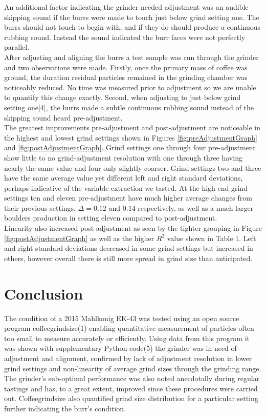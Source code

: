 \documentclass[10pt,a4paper,twocolumn,notitlepage]{article}
\begin{document}
An additional factor indicating the grinder needed adjustment was an audible skipping sound if the burrs were made to touch just below grind setting one. The burrs should not touch to begin with, and if they do should produce a continuous rubbing sound. Instead the sound indicated the burr faces were not perfectly parallel. \\

After adjusting and aligning the burrs a test sample was run through the grinder and two observations were made. Firstly, once the primary mass of coffee was ground, the duration residual particles remained in the grinding chamber was noticeably reduced. No time was measured prior to adjustment so we are unable to quantify this change exactly. Second, when adjusting to just below grind setting one[4], the burrs made a subtle continuous rubbing sound instead of the skipping sound heard pre-adjustment. \\

The greatest improvements pre-adjustment and post-adjustment are noticeable in the highest and lowest grind settings shown in Figures \ref{fig:preAdjustmentGraph} and \ref{fig:postAdjustmentGraph}. Grind settings one through four pre-adjustment show little to no grind-adjustment resolution with one through three having nearly the same value and four only slightly coarser. Grind settings two and three have the same average value yet different left and right standard deviations, perhaps indicative of the variable extraction we tasted. At the high end grind settings ten and eleven pre-adjustment have much higher average changes from their previous settings, $\Delta=0.12$ and $0.14$ respectively, as well as a much larger boulders production in setting eleven compared to post-adjustment.\\

Linearity also increased post-adjustment as seen by the tighter grouping in Figure \ref{fig:postAdjustmentGraph} as well as the higher $R^2$ value shown in Table 1. Left and right standard deviations decreased in some grind settings but increased in others, however overall there is still more spread in grind size than anticipated. \\

\section{Conclusion}

The condition of a 2015 Mahlkonig EK-43 was tested using an open source program coffeegrindsize(1) enabling quantitative measurement of particles often too small to measure accurately or efficiently. Using data from this program it was shown with supplementary Python code(5) the grinder was in need of adjustment and alignment, confirmed by lack of adjustment resolution in lower grind settings and non-linearity of average grind sizes through the grinding range. The grinder's sub-optimal performance was also noted anecdotally during regular tastings and has, to a great extent, improved since these procedures were carried out. Coffeegrindsize also quantified grind size distribution for a particular setting further indicating the burr's condition.
\end{document}

